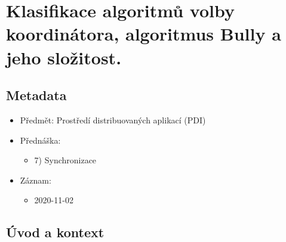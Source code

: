 

\chapter{Klasifikace algoritmů volby koordinátora, algoritmus Bully a jeho složitost.}


\section{Metadata}

\begin{itemize}
    \item Předmět: Prostředí distribuovaných aplikací (PDI)
    \item Přednáška:
    \begin{itemize}
        \item 7) Synchronizace
    \end{itemize}
    \item Záznam:
    \begin{itemize}
        \item 2020-11-02
    \end{itemize}
\end{itemize}


\section{Úvod a kontext}

